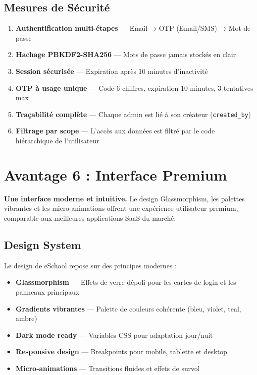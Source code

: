 \documentclass[12pt,a4paper,oneside]{report}
\begin{document}
\section{Mesures de Sécurité}

\begin{enumerate}
  \item \textbf{Authentification multi-étapes} — Email → OTP (Email/SMS) → Mot de passe
  \item \textbf{Hachage PBKDF2-SHA256} — Mots de passe jamais stockés en clair
  \item \textbf{Session sécurisée} — Expiration après 10 minutes d'inactivité
  \item \textbf{OTP à usage unique} — Code 6 chiffres, expiration 10 minutes, 3 tentatives max
  \item \textbf{Traçabilité complète} — Chaque admin est lié à son créateur (\texttt{created\_by})
  \item \textbf{Filtrage par scope} — L'accès aux données est filtré par le code hiérarchique de l'utilisateur
\end{enumerate}


\chapter{Avantage 6 : Interface Premium}

\begin{avantage}
\textbf{Une interface moderne et intuitive.} Le design Glassmorphism, les palettes vibrantes et les micro-animations offrent une expérience utilisateur premium, comparable aux meilleures applications SaaS du marché.
\end{avantage}

\section{Design System}

Le design de eSchool repose sur des principes modernes :

\begin{itemize}
  \item \textbf{Glassmorphism} — Effets de verre dépoli pour les cartes de login et les panneaux principaux
  \item \textbf{Gradients vibrantes} — Palette de couleurs cohérente (bleu, violet, teal, ambre)
  \item \textbf{Dark mode ready} — Variables CSS pour adaptation jour/nuit
  \item \textbf{Responsive design} — Breakpoints pour mobile, tablette et desktop
  \item \textbf{Micro-animations} — Transitions fluides et effets de survol
\end{itemize}
\end{document}
